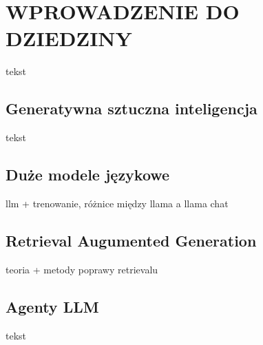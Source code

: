\chapter{WPROWADZENIE DO DZIEDZINY}

tekst

\section{Generatywna sztuczna inteligencja}

tekst

\section{Duże modele językowe}

llm + trenowanie, różnice między llama a llama chat


\section{Retrieval Augumented Generation}

teoria + metody poprawy retrievalu

\section{Agenty LLM}

tekst
